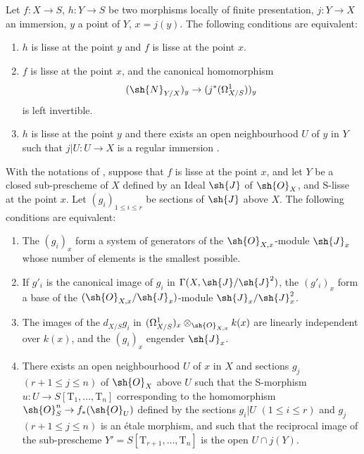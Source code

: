 \begin{theorem}[17.12.1]
\label{IV.17.12.1}
Let $f:X\to S$, $h:Y\to S$ be two morphisms locally of finite presentation, $j:Y\to X$ an immersion, $y$ a point of $Y$, $x=j(y)$.
The following conditions are equivalent:
\begin{enumerate}
  \item[a)] $h$ is lisse at the point $y$ and $f$ is lisse at the point $x$.
  \item[b)] $f$ is lisse at the point $x$, and the canonical homomorphism 
\[
(\sh{N}_{Y/X})_y \to (j^*(\Omega^1_{X/S}))_y
\]
is left invertible.
  \item[c)] $h$ is lisse at the point $y$ and there exists an open neighbourhood $U$ of $y$ in $Y$ such that $j|U:U\to X$ is a regular immersion .
\end{enumerate}
\end{theorem}

\begin{corollary}[17.12.2]
\label{IV.17.12.2}
With the notations of , suppose that $f$ is lisse at the point $x$, and let $Y$ be a closed sub-prescheme of $X$ defined by an Ideal $\sh{J}$ of $\sh{O}_X$, and S-lisse at the point $x$.
Let $(g_i)_{1\leq i\leq r}$ be sections of $\sh{J}$ above $X$.
The following conditions are equivalent:
\begin{enumerate}
  \item[a)] The $(g_i)_x$ form a system of generators of the $\sh{O}_{X,x}$-module $\sh{J}_x$ whose number of elements is the smallest possible.
  \item[b)] If $g'_i$ is the canonical image of $g_i$ in $\Gamma(X,\sh{J}/\sh{J}^2)$, the $(g'_i)_x$ form a base of the $(\sh{O}_{X,x}/\sh{J}_x)$-module $\sh{J}_x/\sh{J}_x^2$.
  \item[c)] The images of the $d_{X/S} g_i$ in $(\Omega^1_{X/S})_x\otimes_{\sh{O}_{X,x}} k(x)$ are linearly independent over $k(x)$, and the $(g_i)_x$ engender $\sh{J}_x$.
  \item[d)] There exists an open neighbourhood $U$ of $x$ in $X$ and sections $g_j$ $(r+1\leq j\leq n)$ of $\sh{O}_X$ above $U$ such that the S-morphism $u:U\to S[\mathrm{T}_1,\ldots,\mathrm{T}_n]$ corresponding to the homomorphism $\sh{O}^n_S\to f_*(\sh{O}_U)$ defined by the sections $g_i|U$ $(1\leq i\leq r)$ and $g_j$ $(r+1\leq j\leq n)$ is an \'etale morphism, and such that the reciprocal image of the sub-prescheme $Y'=S[\mathrm{T}_{r+1},\ldots,\mathrm{T}_n]$ is the open $U\cap j(Y)$.
\end{enumerate}
\end{corollary}


